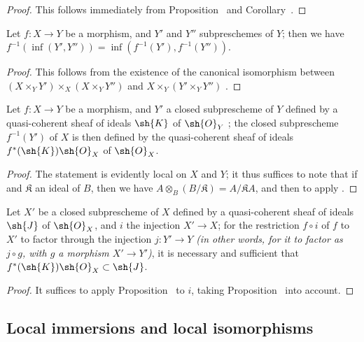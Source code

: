 \begin{proof}
This follows immediately from Proposition~ and Corollary~.
\end{proof}

\begin{corollary}[4.4.4]
\label{I.4.4.4}
Let $f:X\to Y$ be a morphism, and $Y'$ and $Y''$ subpreschemes of $Y$;
then we have $f^{-1}(\inf(Y',Y''))=\inf(f^{-1}(Y'),f^{-1}(Y''))$.
\end{corollary}

\begin{proof}
This follows from the existence of the canonical isomorphism between $(X\times_Y Y')\times_X(X\times_Y Y'')$ and $X\times_Y(Y'\times_Y Y'')$ .
\end{proof}

\begin{proposition}[4.4.5]
\label{I.4.4.5}
Let $f:X\to Y$ be a morphism, and $Y'$ a closed subprescheme of $Y$ defined by a quasi-coherent sheaf of ideals $\sh{K}$ of $\sh{O}_Y$ ;
the closed subprescheme $f^{-1}(Y')$ of $X$ is then defined by the quasi-coherent sheaf of ideals $f^*(\sh{K})\sh{O}_X$ of $\sh{O}_X$.
\end{proposition}

\begin{proof}
The statement is evidently local on $X$ and $Y$;
it thus suffices to note that if  and $\mathfrak{K}$ an ideal of $B$, then we have $A\otimes_B(B/\mathfrak{K})=A/\mathfrak{K}A$, and then to apply .
\end{proof}

\begin{corollary}[4.4.6]
\label{I.4.4.6}
Let $X'$ be a closed subprescheme of $X$ defined by a quasi-coherent sheaf of ideals $\sh{J}$ of $\sh{O}_X$, and $i$ the injection $X'\to X$;
for the restriction $f\circ i$ of $f$ to $X'$ to factor through the injection $j:Y'\to Y$ \emph{(in other words, for it to factor as $j\circ g$, with $g$ a morphism $X'\to Y'$)}, it is necessary and sufficient that $f^*(\sh{K})\sh{O}_X\subset\sh{J}$.
\end{corollary}

\begin{proof}
It suffices to apply Proposition~ to $i$, taking Proposition~ into account.
\end{proof}

\subsection{Local immersions and local isomorphisms}
\label{subsection:I.4.5}

